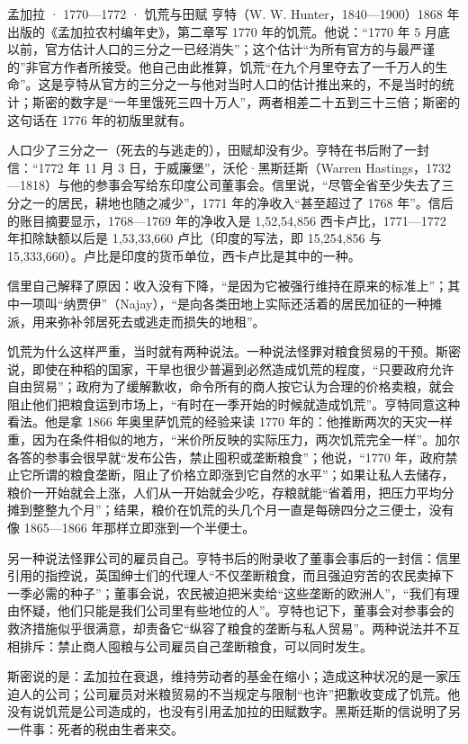 \begin{case}{孟加拉 · 1770—1772 · 饥荒与田赋}
亨特（W. W. Hunter，1840—1900）1868 年出版的《孟加拉农村编年史》，第二章写 1770 年的饥荒。他说：“1770 年 5 月底以前，官方估计人口的三分之一已经消失”；这个估计“为所有官方的与最严谨的”非官方作者所接受\cite{hunter1868}。他自己由此推算，饥荒“在九个月里夺去了一千万人的生命”\cite{hunter1868}。这是亨特从官方的三分之一与他对当时人口的估计推出来的，不是当时的统计；斯密的数字是“一年里饿死三四十万人”，两者相差二十五到三十三倍；斯密的这句话在 1776 年的初版里就有\cite{hunter1868,smith1776}。

人口少了三分之一（死去的与逃走的），田赋却没有少。亨特在书后附了一封信：“1772 年 11 月 3 日，于威廉堡”，沃伦·黑斯廷斯（Warren Hastings，1732—1818）与他的参事会写给东印度公司董事会\cite{hunter1868}。信里说，“尽管全省至少失去了三分之一的居民，耕地也随之减少”，1771 年的净收入“甚至超过了 1768 年”\cite{hunter1868}。信后的账目摘要显示，1768—1769 年的净收入是 1,52,54,856 西卡卢比，1771—1772 年扣除缺额以后是 1,53,33,660 卢比（印度的写法，即 15,254,856 与 15,333,660）\cite{hunter1868}。卢比是印度的货币单位，西卡卢比是其中的一种。

信里自己解释了原因：收入没有下降，“是因为它被强行维持在原来的标准上”；其中一项叫“纳贾伊”（Najay），“是向各类田地上实际还活着的居民加征的一种摊派，用来弥补邻居死去或逃走而损失的地租”\cite{hunter1868}。

饥荒为什么这样严重，当时就有两种说法。一种说法怪罪对粮食贸易的干预。斯密说，即使在种稻的国家，干旱也很少普遍到必然造成饥荒的程度，“只要政府允许自由贸易”；政府为了缓解歉收，命令所有的商人按它认为合理的价格卖粮，就会阻止他们把粮食运到市场上，“有时在一季开始的时候就造成饥荒”\cite{smith1776}。亨特同意这种看法。他是拿 1866 年奥里萨饥荒的经验来读 1770 年的：他推断两次的天灾一样重，因为在条件相似的地方，“米价所反映的实际压力，两次饥荒完全一样”\cite{hunter1868}。加尔各答的参事会很早就“发布公告，禁止囤积或垄断粮食”；他说，“1770 年，政府禁止它所谓的粮食垄断，阻止了价格立即涨到它自然的水平”；如果让私人去储存，粮价一开始就会上涨，人们从一开始就会少吃，存粮就能“省着用，把压力平均分摊到整整九个月”；结果，粮价在饥荒的头几个月一直是每磅四分之三便士，没有像 1865—1866 年那样立即涨到一个半便士\cite{hunter1868}。

另一种说法怪罪公司的雇员自己。亨特书后的附录收了董事会事后的一封信：信里引用的指控说，英国绅士们的代理人“不仅垄断粮食，而且强迫穷苦的农民卖掉下一季必需的种子”；董事会说，农民被迫把米卖给“这些垄断的欧洲人”，“我们有理由怀疑，他们只能是我们公司里有些地位的人”\cite{hunter1868}。亨特也记下，董事会对参事会的救济措施似乎很满意，却责备它“纵容了粮食的垄断与私人贸易”\cite{hunter1868}。两种说法并不互相排斥：禁止商人囤粮与公司雇员自己垄断粮食，可以同时发生。

斯密说的是：孟加拉在衰退，维持劳动者的基金在缩小；造成这种状况的是一家压迫人的公司；公司雇员对米粮贸易的不当规定与限制“也许”把歉收变成了饥荒。他没有说饥荒是公司造成的，也没有引用孟加拉的田赋数字。黑斯廷斯的信说明了另一件事：死者的税由生者来交。
\end{case}

